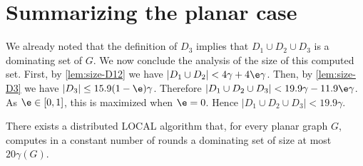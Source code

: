 \section{Summarizing the planar case}

We already noted that the definition of $D_3$ implies that
$D_1\cup D_2\cup D_3$ is a dominating set of $G$. We now conclude the
analysis of the size of this computed set.  First, by
\cref{lem:size-D12} we have $|D_1\cup D_2|<4\gamma+4\e\gamma$.  Then,
by \cref{lem:size-D3} we have $|D_3|\le 15.9(1-\e)\gamma$.
%
Therefore $|D_1 \cup D_2 \cup D_3| < 19.9\gamma -11.9\e\gamma$.
%
As $\e\in[0,1]$, this is maximized when $\e=0$. Hence
\mbox{$|D_1 \cup D_2 \cup D_3|< 19.9 \gamma$}.

\begin{theorem}\label{thm:planar}
  There exists a distributed LOCAL algorithm that, for every planar
  graph $G$, computes in a constant number of rounds a dominating set
  of size at most $20\gamma(G)$.
\end{theorem}
